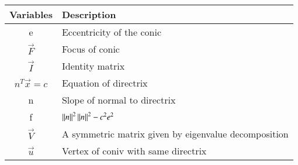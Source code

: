 \begin{tabular}{|c|p{5cm}|}
\hline
	\textbf{Variables} & \textbf{Description} \\  \hline
	e  & Eccentricity of the conic\\ \hline
	$\vec F$ & Focus of conic\\ \hline
	$\vec I$ & Identity matrix \\ \hline
	$n^T \vec x=c$& Equation of directrix \\ \hline
	n& Slope of normal to directrix \\ \hline
	f& $\left\vert\left\vert n\right\vert\right\vert^2\left\vert\left\vert n\right\vert\right\vert^2-c^2e^2$ \\ \hline
	$\vec V$ & A symmetric matrix given by eigenvalue decomposition \\ \hline
	$\vec u$& Vertex of coniv with same directrix \\ \hline 

\end{tabular}

